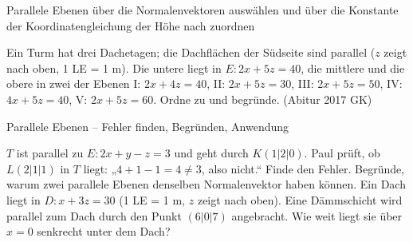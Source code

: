 \begin{aufgabe}{Parallele Ebenen über die Normalenvektoren auswählen und über die Konstante der Koordinatengleichung der Höhe nach zuordnen}
\begin{teile}
\teil Ein Turm hat drei Dachetagen; die Dachflächen der Südseite sind parallel ($z$ zeigt nach oben, 1 LE = 1 m). Die untere liegt in $E\colon 2x + 5z = 40$, die mittlere und die obere in zwei der Ebenen I: $2x + 4z = 40$, II: $2x + 5z = 30$, III: $2x + 5z = 50$, IV: $4x + 5z = 40$, V: $2x + 5z = 60$. Ordne zu und begründe. \hfill (Abitur 2017 GK)
\end{teile}
\end{aufgabe}

\begin{aufgabe}{Parallele Ebenen – Fehler finden, Begründen, Anwendung}
\begin{teile}
\teil $T$ ist parallel zu $E\colon 2x + y - z = 3$ und geht durch $K(1 | 2 | 0)$. Paul prüft, ob $L(2 | 1 | 1)$ in $T$ liegt: „$4 + 1 - 1 = 4 \ne 3$, also nicht.“ Finde den Fehler.
\teil Begründe, warum zwei parallele Ebenen denselben Normalenvektor haben können.
\teil Ein Dach liegt in $D\colon x + 3z = 30$ (1 LE = 1 m, $z$ zeigt nach oben). Eine Dämmschicht wird parallel zum Dach durch den Punkt $(6 | 0 | 7)$ angebracht. Wie weit liegt sie über $x = 0$ senkrecht unter dem Dach?
\end{teile}
\end{aufgabe}
